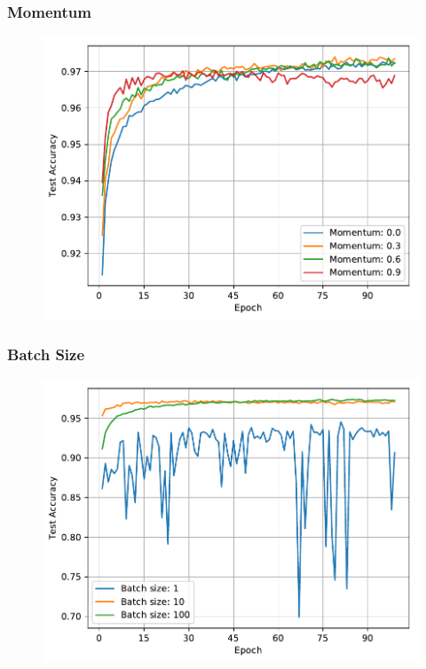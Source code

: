 \documentclass[pdf]{beamer}
\begin{document}
\begin{frame}
\frametitle{Momentum}
\begin{figure}[!htb]
  \includegraphics[height=0.8\textheight]{plots/momentum_zoom.pdf}
\end{figure}
\end{frame}

\begin{frame}
\frametitle{Batch Size}
\begin{figure}[!htb]
  \includegraphics[height=0.8\textheight]{plots/batch_size_zoom.pdf}
\end{figure}
\end{frame}
\end{document}

